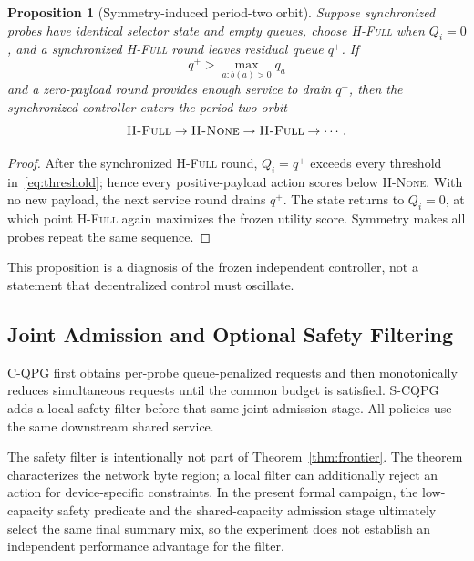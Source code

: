\documentclass[10pt,journal]{IEEEtran}
\newtheorem{proposition}{Proposition}
\newcommand{\Hnone}{\textsc{H-None}}
\newcommand{\Hfull}{\textsc{H-Full}}
\newcommand{\CQPG}{\textsc{C-QPG}}
\newcommand{\SCQPG}{\textsc{S-CQPG}}
\begin{document}
\begin{proposition}[Symmetry-induced period-two orbit]
\label{prop:cycle}
Suppose synchronized probes have identical selector state and empty
queues, choose \Hfull{} when $Q_i=0$, and a synchronized \Hfull{} round
leaves residual queue $q^+$. If
\begin{equation}
q^+>\max_{a:b(a)>0} q_a
\end{equation}
and a zero-payload round provides enough service to drain $q^+$, then
the synchronized controller enters the period-two orbit
\begin{equation}
\Hfull
\rightarrow
\Hnone
\rightarrow
\Hfull
\rightarrow\cdots .
\end{equation}
\end{proposition}

\begin{proof}
After the synchronized \Hfull{} round, $Q_i=q^+$ exceeds every threshold
in~\eqref{eq:threshold}; hence every positive-payload action scores below
\Hnone{}. With no new payload, the next service round drains $q^+$.
The state returns to $Q_i=0$, at which point \Hfull{} again maximizes the
frozen utility score. Symmetry makes all probes repeat the same sequence.
\end{proof}

This proposition is a diagnosis of the frozen independent controller,
not a statement that decentralized control must oscillate.

\subsection{Joint Admission and Optional Safety Filtering}

\CQPG{} first obtains per-probe queue-penalized requests and then
monotonically reduces simultaneous requests until the common budget is
satisfied. \SCQPG{} adds a local safety filter before that same joint
admission stage. All policies use the same downstream shared service.

The safety filter is intentionally not part of
Theorem~\ref{thm:frontier}. The theorem characterizes the network byte
region; a local filter can additionally reject an action for
device-specific constraints. In the present formal campaign, the
low-capacity safety predicate and the shared-capacity admission stage
ultimately select the same final summary mix, so the experiment does
not establish an independent performance advantage for the filter.

\end{document}
